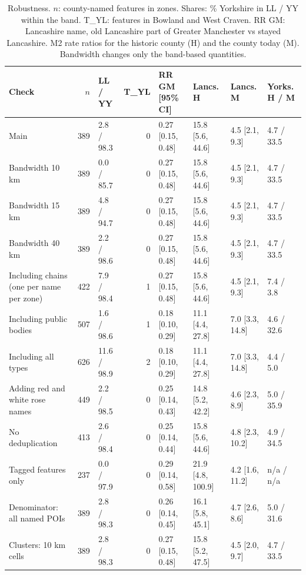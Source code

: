 \documentclass[11pt,a4paper]{article}
\begin{document}
\begin{table}[tbp]\centering\scriptsize\caption{Robustness. $n$: county-named features in zones. Shares: \% Yorkshire in LL / YY within the band. T\_YL: features in Bowland and West Craven. RR GM: Lancashire name, old Lancashire part of Greater Manchester vs stayed Lancashire. M2 rate ratios for the historic county (H) and the county today (M). Bandwidth changes only the band-based quantities.}\label{tab:robust}\setlength{\tabcolsep}{2.5pt}\begin{tabular}{p{3.6cm}rlrllll}\toprule Check & $n$ & LL / YY & T\_YL & RR GM [95\% CI] & Lancs. H & Lancs. M & Yorks. H / M\\\midrule
Main & 389 & 2.8 / 98.3 & 0 & 0.27 [0.15, 0.48] & 15.8 [5.6, 44.6] & 4.5 [2.1, 9.3] & 4.7 / 33.5\\
Bandwidth 10 km & 389 & 0.0 / 85.7 & 0 & 0.27 [0.15, 0.48] & 15.8 [5.6, 44.6] & 4.5 [2.1, 9.3] & 4.7 / 33.5\\
Bandwidth 15 km & 389 & 4.8 / 94.7 & 0 & 0.27 [0.15, 0.48] & 15.8 [5.6, 44.6] & 4.5 [2.1, 9.3] & 4.7 / 33.5\\
Bandwidth 40 km & 389 & 2.2 / 98.6 & 0 & 0.27 [0.15, 0.48] & 15.8 [5.6, 44.6] & 4.5 [2.1, 9.3] & 4.7 / 33.5\\
Including chains (one per name per zone) & 422 & 7.9 / 98.4 & 1 & 0.27 [0.15, 0.48] & 15.8 [5.6, 44.6] & 4.5 [2.1, 9.3] & 7.4 / 3.8\\
Including public bodies & 507 & 1.6 / 98.6 & 1 & 0.18 [0.10, 0.29] & 11.1 [4.4, 27.8] & 7.0 [3.3, 14.8] & 4.6 / 32.6\\
Including all types & 626 & 11.6 / 98.9 & 2 & 0.18 [0.10, 0.29] & 11.1 [4.4, 27.8] & 7.0 [3.3, 14.8] & 4.4 / 5.0\\
Adding red and white rose names & 449 & 2.2 / 98.5 & 0 & 0.25 [0.14, 0.43] & 14.8 [5.2, 42.2] & 4.6 [2.3, 8.9] & 5.0 / 35.9\\
No deduplication & 413 & 2.6 / 98.4 & 0 & 0.25 [0.14, 0.44] & 15.8 [5.6, 44.6] & 4.8 [2.3, 10.2] & 4.9 / 34.5\\
Tagged features only & 237 & 0.0 / 97.9 & 0 & 0.29 [0.14, 0.58] & 21.9 [4.8, 100.9] & 4.2 [1.6, 11.2] & n/a / n/a\\
Denominator: all named POIs & 389 & 2.8 / 98.3 & 0 & 0.26 [0.14, 0.45] & 16.1 [5.8, 45.1] & 4.7 [2.6, 8.6] & 5.0 / 31.6\\
Clusters: 10 km cells & 389 & 2.8 / 98.3 & 0 & 0.27 [0.15, 0.48] & 15.8 [5.2, 47.5] & 4.5 [2.0, 9.7] & 4.7 / 33.5\\
\bottomrule\end{tabular}\end{table}
\end{document}

